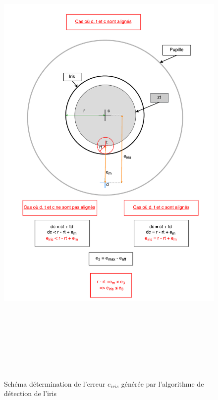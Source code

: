 \documentclass[a4paper, 12pt]{report}
\begin{document}
    \begin{figure}
    \centering\includegraphics[height=24cm]{erreur_oeil_2.pdf}
	\caption{Schéma détermination de l'erreur $e_{iris}$ générée par l'algorithme de détection de l'iris}
	\end{figure}
    \newpage
\end{document}
